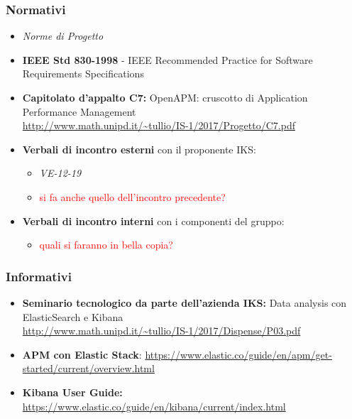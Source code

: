 	\subsubsection{Normativi}
	\begin{itemize}
		\item \emph{Norme di Progetto}
		\item \textbf{IEEE Std 830-1998} - IEEE Recommended Practice for Software Requirements Specifications
		\item \textbf{Capitolato d'appalto C7:} OpenAPM: cruscotto di Application Performance Management \\ \url{http://www.math.unipd.it/~tullio/IS-1/2017/Progetto/C7.pdf}
		\item \textbf{Verbali di incontro esterni } con il proponente IKS: \begin{itemize}
			\item \emph{VE-12-19}
			\item \textcolor{red}{si fa anche quello dell'incontro precedente?}
		\end{itemize}
		\item \textbf{Verbali di incontro interni }con i componenti del gruppo:
		\begin{itemize}
			\item \textcolor{red}{quali si faranno in bella copia?}
		\end{itemize}
	\end{itemize}
	
	\subsubsection{Informativi}
	\begin{itemize}
		\item \textbf{Seminario tecnologico da parte dell'azienda IKS:} Data analysis con ElasticSearch e Kibana \\ \url{http://www.math.unipd.it/~tullio/IS-1/2017/Dispense/P03.pdf}
		\item \textbf{APM con Elastic Stack}: \url{https://www.elastic.co/guide/en/apm/get-started/current/overview.html}
		\item \textbf{Kibana User Guide:} \url{https://www.elastic.co/guide/en/kibana/current/index.html}
	
	\end{itemize}
	